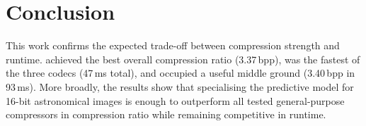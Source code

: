 \section{Conclusion}
\label{sec:conclusion}

This work confirms the expected trade-off between compression strength and
runtime. \cmpfocused{} achieved the best overall compression ratio
(3.37\,bpp), \spdfocused{} was the fastest of the three codecs (47\,ms
total), and \allrounder{} occupied a useful middle ground (3.40\,bpp in
93\,ms). More broadly, the results show that specialising the predictive
model for 16-bit astronomical images is enough to outperform all tested
general-purpose compressors in compression ratio while remaining competitive
in runtime.
